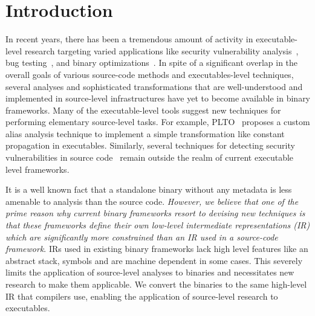 \section{Introduction} \label{sec:intro}

In recent years, there has been a tremendous amount of activity in executable-level research targeting varied applications like security vulnerability analysis~\cite{Brumley-Mayhem,Song-Bitblaze}, bug testing~\cite{Chipounov-S2E}, and binary optimizations~\cite{plto, ispike}. In spite of a significant overlap in the overall goals of various source-code methods and executables-level techniques, several analyses and sophisticated transformations that are well-understood and implemented in source-level infrastructures have yet to become available in binary frameworks. Many of the executable-level tools suggest new techniques for performing elementary source-level tasks. For example, PLTO~\cite{plto} proposes a custom alias analysis technique to implement a simple transformation like constant propagation in executables. Similarly, several techniques for detecting security vulnerabilities in source code~\cite{Wagner-afirst, Bush-static} remain outside the realm of current executable level frameworks. 

%
It is a well known fact that a standalone binary without any metadata is less amenable to analysis than the source code. \emph{However, we believe that one of the prime reason why current binary frameworks resort to devising new techniques is that these frameworks define their own low-level intermediate representations (IR) which are significantly more constrained than an IR used in a source-code framework}. IRs used in existing binary frameworks lack high level features like an abstract stack, symbols and are machine dependent in some cases. This severely limits the application of source-level analyses to binaries and necessitates new research to make them applicable. We convert the binaries to the same high-level IR that compilers use, enabling the application of source-level research to executables.

